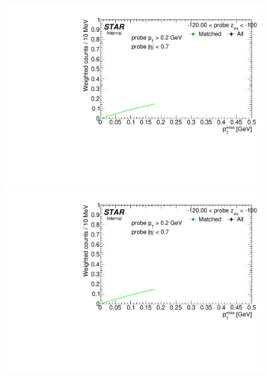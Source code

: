 \begin{figure}[h!]
{  \includegraphics[width=\linewidth,page=7]{graphics/correctionsToEff/TOF_tagAndProbe/Fitting_effVsZVtx_data.CPT2.pdf}\\
  \includegraphics[width=\linewidth,page=9]{graphics/correctionsToEff/TOF_tagAndProbe/Fitting_effVsZVtx_data.CPT2.pdf}

}
\end{figure}
